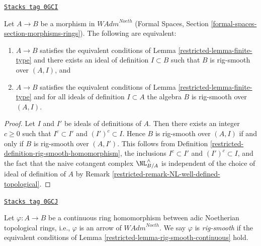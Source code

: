 \begin{lemma}
\label{restricted-lemma-rig-smooth-continuous}
\href{https://stacks.math.columbia.edu/tag/0GCI}{\texttt{Stacks tag 0GCI}}

Let $A \to B$ be a morphism in $\textit{WAdm}^{Noeth}$
(Formal Spaces, Section \ref{formal-spaces-section-morphisms-rings}).
The following are equivalent:
\begin{enumerate}
\item[(a)] $A \to B$ satisfies the equivalent conditions of
Lemma \ref{restricted-lemma-finite-type} and there exists an ideal of definition
$I \subset B$ such that $B$ is rig-smooth over $(A, I)$, and
\item[(b)] $A \to B$ satisfies the equivalent conditions of
Lemma \ref{restricted-lemma-finite-type} and for all ideals of definition
$I \subset A$ the algebra $B$ is rig-smooth over $(A, I)$.
\end{enumerate}
\end{lemma}

\begin{proof}

Let $I$ and $I'$ be ideals of definitions of $A$. Then there exists an
integer $c \geq 0$ such that $I^c \subset I'$ and $(I')^c \subset I$. Hence
$B$ is rig-smooth over $(A, I)$ if and only if
$B$ is rig-smooth over $(A, I')$. This follows from
Definition \ref{restricted-definition-rig-smooth-homomorphism},
the inclusions $I^c \subset I'$ and $(I')^c \subset I$, and
the fact that the naive cotangent complex $\NL_{B/A}^\wedge$
is independent of the choice of ideal of definition of $A$ by
Remark \ref{restricted-remark-NL-well-defined-topological}.
\end{proof}

\begin{definition}
\label{restricted-definition-rig-smooth-continuous-homomorphism}
\href{https://stacks.math.columbia.edu/tag/0GCJ}{\texttt{Stacks tag 0GCJ}}

Let $\varphi : A \to B$ be a continuous ring homomorphism
between adic Noetherian topological rings, i.e., $\varphi$
is an arrow of $\textit{WAdm}^{Noeth}$. We say
$\varphi$ is {\it rig-smooth} if the equivalent conditions
of Lemma \ref{restricted-lemma-rig-smooth-continuous} hold.
\end{definition}


